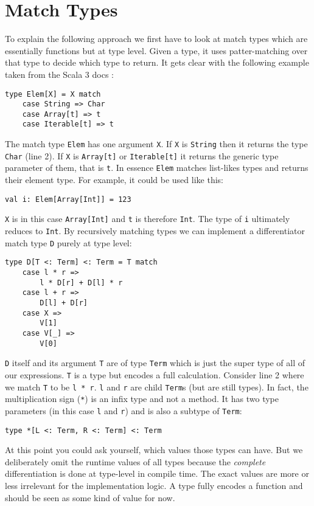 \section{Match Types} \label{sec:matchTypes}
To explain the following approach we first have to look at match types which are essentially functions but at type level. Given a type, it uses patter-matching over that type to decide which type to return. It gets clear with the following example taken from the Scala 3 docs \cite{matchTypesScala3}:
\begin{lstlisting}
type Elem[X] = X match
    case String => Char
    case Array[t] => t
    case Iterable[t] => t
\end{lstlisting}
The match type \lstinline{Elem} has one argument \lstinline{X}. If \lstinline{X} is \lstinline{String} then it returns the type \lstinline{Char} (line 2). If \lstinline{X} is \lstinline{Array[t]} or \lstinline{Iterable[t]} it returns the generic type parameter of them, that is \lstinline{t}. In essence \lstinline{Elem} matches list-likes types and returns their element type. For example, it could be used like this:
\begin{lstlisting}
val i: Elem[Array[Int]] = 123
\end{lstlisting}
\lstinline{X} is in this case \lstinline{Array[Int]} and \lstinline{t} is therefore \lstinline{Int}. The type of \lstinline{i} ultimately reduces to \lstinline{Int}. By recursively matching types we can implement a differentiator match type \lstinline{D} purely at type level:
\begin{lstlisting}
type D[T <: Term] <: Term = T match
    case l * r => 
        l * D[r] + D[l] * r
    case l + r => 
        D[l] + D[r]
    case X => 
        V[1]
    case V[_] => 
        V[0]
\end{lstlisting}
\lstinline{D} itself and its argument \lstinline{T} are of type \lstinline{Term} which is just the super type of all of our expressions.
\lstinline{T} is a type but encodes a full calculation. Consider line 2 where we match \lstinline{T} to be \lstinline{l * r}. \lstinline{l} and \lstinline{r} are child \lstinline{Term}s (but are still types). In fact, the multiplication sign (\lstinline{*}) is  an infix type and not a method. It has two type parameters (in this case \lstinline{l} and \lstinline{r}) and is also a subtype of \lstinline{Term}:
\begin{lstlisting}
type *[L <: Term, R <: Term] <: Term
\end{lstlisting}
At this point you could ask yourself, which values those types can have. But we deliberately omit the runtime values of all types because the \emph{complete} differentiation is done at type-level in compile time. The exact values are more or less irrelevant for the implementation logic. A type fully encodes a function and should be seen as some kind of value for now.

